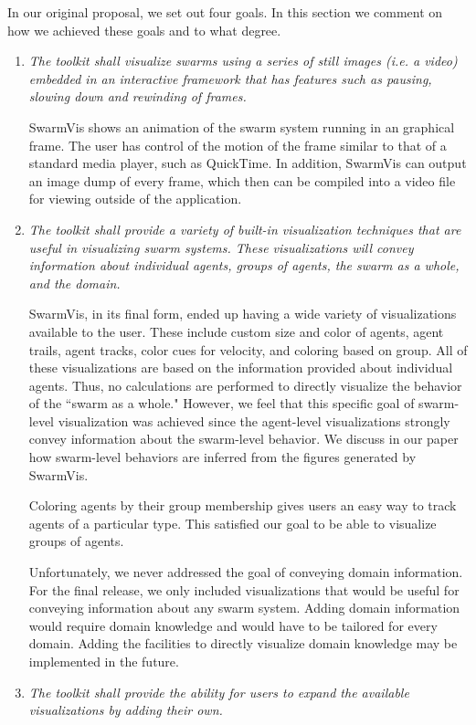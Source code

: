 \documentclass{article}
\begin{document}
In our original proposal, we set out four goals. In this section we comment on how we achieved these goals and to what degree.
\begin{enumerate}
\item {\em The toolkit shall visualize swarms using a series of still images (i.e. a video) embedded in an interactive framework that has features such as pausing, slowing down and rewinding of frames.}

SwarmVis shows an animation of the swarm system running in an graphical frame. The user has control of the motion of the frame similar to that of a standard media player, such as QuickTime. In addition, SwarmVis can output an image dump of every frame, which then can be compiled into a video file for viewing outside of the application.

\item {\em The toolkit shall provide a variety of built-in visualization techniques that are useful in visualizing swarm systems. These visualizations will convey information about individual agents, groups of agents, the swarm as a whole, and the domain.}

SwarmVis, in its final form, ended up having a wide variety of visualizations available to the user. These include custom size and color of agents, agent trails, agent tracks, color cues for velocity, and coloring based on group. All of these visualizations are based on the information provided about individual agents. Thus, no calculations are performed to directly visualize the behavior of the ``swarm as a whole." However, we feel that this specific goal of swarm-level visualization was achieved since the agent-level visualizations strongly convey information about the swarm-level behavior. We discuss in our paper how swarm-level behaviors are inferred from the figures generated by SwarmVis.

Coloring agents by their group membership gives users an easy way to track agents of a particular type. This satisfied our goal to be able to visualize groups of agents.

Unfortunately, we never addressed the goal of conveying domain information. For the final release, we only included visualizations that would be useful for conveying information about any swarm system. Adding domain information would require domain knowledge and would have to be tailored for every domain. Adding the facilities to directly visualize domain knowledge may be implemented in the future.

\item {\em The toolkit shall provide the ability for users to expand the available visualizations by adding their own.}


\end{enumerate}
\end{document}

